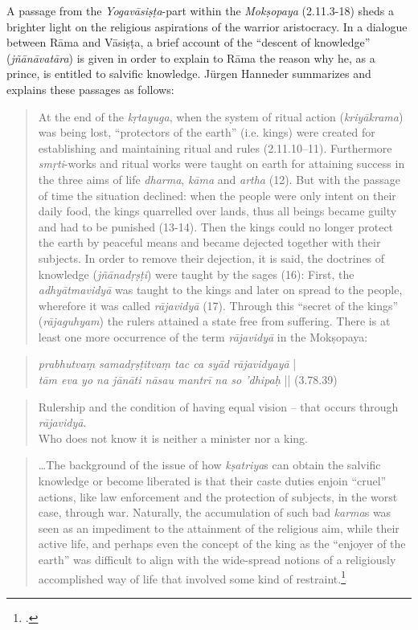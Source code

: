 A passage from the \textit{Yogavāsiṣṭa}-part within the \textit{Mokṣopaya} (2.11.3-18) sheds a brighter light on the religious aspirations of the warrior aristocracy. In a dialogue between Rāma and Vāsiṣṭa, a brief account of the ``descent of knowledge'' (\textit{jñānāvatāra}) is given in order to explain to Rāma the reason why he, as a prince, is entitled to salvific knowledge. Jürgen Hanneder summarizes and explains these passages as follows:
\begin{quote}
At the end of the \textit{kṛtayuga}, when the system of ritual action (\textit{kriyākrama}) was being lost, ``protectors of the earth'' (i.e. kings) were created for establishing and maintaining ritual and rules (2.11.10–11). Furthermore \textit{smṛti}-works and ritual works were taught on earth for attaining success in the three aims of life \textit{dharma}, \textit{kāma} and \textit{artha} (12). But with the passage of time the situation declined: when the people were only intent on their daily food, the kings quarrelled over lands, thus all beings became guilty and had to be punished (13-14). Then the kings could no longer protect the earth by peaceful means and became dejected together with their subjects. In order to remove their dejection, it is said, the doctrines of knowledge (\textit{jñānadṛṣṭi}) were taught by the sages (16): First, the \textit{adhyātmavidyā} was taught to the kings and later on spread to the people, wherefore it was called \textit{rājavidyā} (17). Through this ``secret of the kings'' (\textit{rājaguhyam}) the rulers attained a state free from suffering.
There is at least one more occurrence of the term \textit{rājavidyā} in the Mokṣopaya:
\end{quote}
\begin{quote}
  \textit{prabhutvaṃ samadṛṣṭitvaṃ tac ca syād rājavidyayā} | \\
  \textit{tām eva yo na jānāti nāsau mantrī na so 'dhipaḥ} || (3.78.39)
  \end{quote}
  \begin{quote}
    Rulership and the condition of having equal vision – that occurs through \textit{rājavidyā}. \\
    Who does not know it is neither a minister nor a king. 
\end{quote} 
\begin{quote}
\ldots The background of the issue of how \textit{kṣatriya}s can obtain the salvific knowledge or become liberated is that their caste duties enjoin ``cruel'' actions, like law enforcement and the protection of subjects, in the worst case, through war. Naturally, the accumulation of such bad \textit{karma}s was seen as an impediment to the attainment of the religious aim, while their active life, and perhaps even the concept of the king as the ``enjoyer of the earth'' was difficult to align with the wide-spread notions of a religiously accomplished way of life that involved some kind of restraint.\footnote{\citeauthor[2006: 121]{hanneder2006}.}
\end{quote}

